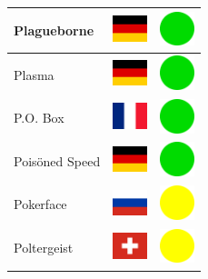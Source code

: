 \documentclass[12pt, a4paper, twoside]{report}
\begin{document}
\begin{center}
\begin{longtable}{|p{5cm}|p{2cm}|p{2cm}|}
Plagueborne & \includegraphics[width=1cm]{4x3/de} & \includegraphics[width=1cm]{likes/y} \\ \hline
Plasma & \includegraphics[width=1cm]{4x3/de} & \includegraphics[width=1cm]{likes/y} \\ \hline
P.O. Box & \includegraphics[width=1cm]{4x3/fr} & \includegraphics[width=1cm]{likes/y} \\ \hline
Poisöned Speed & \includegraphics[width=1cm]{4x3/de} & \includegraphics[width=1cm]{likes/y} \\ \hline
Pokerface & \includegraphics[width=1cm]{4x3/ru} & \includegraphics[width=1cm]{likes/m} \\ \hline
Poltergeist & \includegraphics[width=1cm]{4x3/ch} & \includegraphics[width=1cm]{likes/m} \\ \hline

\end{longtable}
\end{center}
\end{document}
